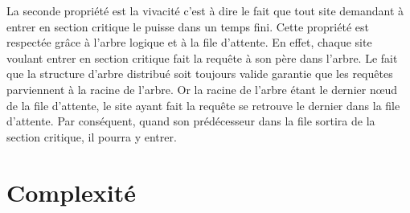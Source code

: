 La seconde propriété est la vivacité c'est à dire le fait que tout site demandant à entrer en section critique le puisse dans un temps fini. Cette propriété est respectée grâce à l'arbre logique et à la file d'attente. En effet, chaque site voulant entrer en section critique fait la requête à son père dans l'arbre. Le fait que la structure d'arbre distribué soit toujours valide garantie que les requêtes parviennent à la racine de l'arbre. Or la racine de l'arbre étant le dernier nœud de la file d'attente, le site ayant fait la requête se retrouve le dernier dans la file d'attente. Par conséquent, quand son prédécesseur dans la file sortira de la section critique, il pourra y entrer.


\section{Complexité}


